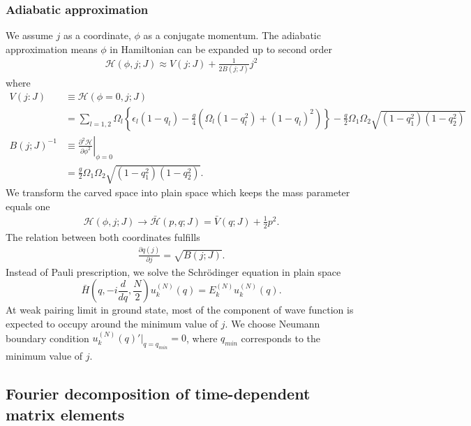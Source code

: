 \documentclass[%
superscriptaddress,
preprint,
showpacs,
nofootinbib,
amsmath,amssymb,
prc,
floatfix ]%
{revtex4-1}
\begin{document}
\subsubsection{Adiabatic approximation}
We assume $j$ as a coordinate, $\phi$ as a conjugate momentum. 
The adiabatic approximation means $\phi$ in Hamiltonian can be
 expanded up to second order
\begin{align}
 \mathcal{H}(\phi,j;J)
	\approx V(j:J) + \frac{1}{2B(j;J)}j^2
\end{align}
where
\begin{align}
 V(j:J) &\equiv \mathcal{H}(\phi=0,j;J) \nonumber \\
  &= \sum_{l=1,2} \Omega_l \left\{ \epsilon_l(1- q_l)
	- \frac{g}{4} (\Omega_l(1-q_l^2)+(1-q_l)^2) \right\}
- \frac{g}{2}\Omega_1\Omega_2
	\sqrt{(1-q_1^2)(1-q_2^2)} \\
 B(j;J)^{-1} &\equiv \left. \frac{\partial^2\mathcal{H}}{\partial\phi^2}\right|_{\phi=0} \nonumber \\
 &= \frac{g}{2}\Omega_1\Omega_2
	\sqrt{(1-q_1^2)(1-q_2^2)} .
\end{align}
We transform the carved space into plain space
 which keeps the mass parameter equals one
\begin{align}
 \mathcal{H}(\phi,j;J) \to \mathcal{\bar{H}}(p,q;J) = \bar{V}(q;J) + \frac{1}{2}p^2 .
\end{align}
The relation between both coordinates fulfills
\begin{align}
 \frac{\partial q(j)}{\partial j} = \sqrt{B(j;J)} .
\end{align}
Instead of Pauli prescription, we solve the Schr\"{o}dinger equation in plain space
\begin{equation}
	\bar{H}\left( q,-i\frac{d}{dq},\frac{N}{2} \right)
	u_k^{(N)}(q) = E_k^{(N)}u_k^{(N)}(q).
	\label{Schroedinger_eq2}
\end{equation}
At weak pairing limit in ground state, most of the component of wave function is expected to occupy around the minimum value of $j$. We choose Neumann boundary condition $u_k^{(N)}(q)'|_{q=q_{min}}=0$, where $q_{min}$ corresponds to the minimum value of $j$.


\subsection{Fourier decomposition of time-dependent matrix elements}
\label{sec:Fourier}
\end{document}
